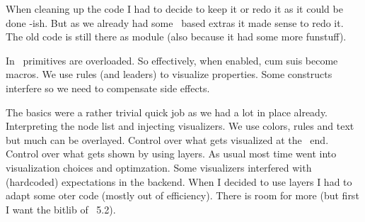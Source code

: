     \startitemize[packed]

        \startitem When cleaning up the code I had to decide to keep it or redo it as it could be done \MKIV-ish. \stopitem \FlushStep
        \startitem But as we already had some \LUA\ based extras it made sense to redo it. \stopitem \FlushStep
        \startitem The old code is still there as module (also because it had some more funstuff). \stopitem \FlushStep

    \stopitemize

\stopsubject

\startsubject[title=How it worked]

    \startitemize[packed]

        \startitem In \MKII\ primitives are overloaded. \stopitem \FlushStep
        \startitem So effectively, when enabled, \type {\hbox} cum suis become macros. \stopitem \FlushStep
        \startitem We use rules (and leaders) to visualize properties. \stopitem \FlushStep
        \startitem Some constructs interfere so we need to compensate side effects. \stopitem \FlushStep

    \stopitemize

\stopsubject

\StopSteps \page \StartSteps

\startsubject[title=How it works]

    \startitemize[packed]

        \startitem The basics were a rather trivial quick job as we had a lot in place already. \stopitem \FlushStep
        \startitem Interpreting the node list and injecting visualizers. \stopitem \FlushStep
        \startitem We use colors, rules and text but much can be overlayed. \stopitem \FlushStep
        \startitem Control over what gets visualized at the \TEX\ end. \stopitem \FlushStep
        \startitem Control over what gets shown by using layers. \stopitem \FlushStep
        \startitem As usual most time went into visualization choices and optimzation. \stopitem \FlushStep
        \startitem Some visualizers interfered with (hardcoded) expectations in the backend. \stopitem \FlushStep
        \startitem When I decided to use layers I had to adapt some oter code (mostly out of efficiency). \stopitem \FlushStep
        \startitem There is room for more (but first I want the bitlib of \LUA\ 5.2). \stopitem \FlushStep

    \stopitemize

\stopsubject

\StopSteps

